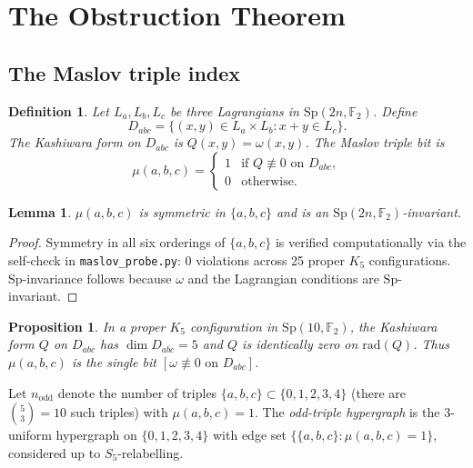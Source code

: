 \documentclass[11pt,a4paper]{article}
\newtheorem{lemma}[theorem]{Lemma}
\newtheorem{proposition}[theorem]{Proposition}
\newtheorem{definition}[theorem]{Definition}
\theoremstyle{remark}
\newcommand{\Sp}{\mathrm{Sp}}
\begin{document}
\section{The Obstruction Theorem}\label{sec:obstruction}

\subsection{The Maslov triple index}

\begin{definition}\label{def:maslov}
Let $L_a,L_b,L_c$ be three Lagrangians in $\Sp(2n,\mathbb F_2)$.  Define
\[
  D_{abc} = \{(x,y)\in L_a\times L_b : x+y\in L_c\}.
\]
The \emph{Kashiwara form} on $D_{abc}$ is $Q(x,y)=\omega(x,y)$.
The \emph{Maslov triple bit} is
\[
  \mu(a,b,c) = \begin{cases} 1 & \text{if }Q\not\equiv0\text{ on }D_{abc}, \\ 0 & \text{otherwise.}\end{cases}
\]
\end{definition}

\begin{lemma}\label{lem:mu_sym}
$\mu(a,b,c)$ is symmetric in $\{a,b,c\}$ and is an $\Sp(2n,\mathbb F_2)$-invariant.
\end{lemma}

\begin{proof}
Symmetry in all six orderings of $\{a,b,c\}$ is verified computationally via the self-check
in \texttt{maslov\_probe.py}: 0 violations across 25 proper $K_5$ configurations.
$\Sp$-invariance follows because $\omega$ and the Lagrangian conditions are $\Sp$-invariant.
\end{proof}

\begin{proposition}\label{prop:mu_structure}
In a proper $K_5$ configuration in $\Sp(10,\mathbb F_2)$, the Kashiwara form $Q$
on $D_{abc}$ has $\dim D_{abc}=5$ and $Q$ is identically zero on $\mathrm{rad}(Q)$.
Thus $\mu(a,b,c)$ is the single bit $[\omega\not\equiv0 \text{ on }D_{abc}]$.
\end{proposition}

\noindent
Let $n_{\mathrm{odd}}$ denote the number of triples $\{a,b,c\}\subset\{0,1,2,3,4\}$
(there are $\binom{5}{3}=10$ such triples) with $\mu(a,b,c)=1$.
The \emph{odd-triple hypergraph} is the 3-uniform hypergraph on $\{0,1,2,3,4\}$
with edge set $\{\{a,b,c\}:\mu(a,b,c)=1\}$, considered up to $S_5$-relabelling.
\end{document}

